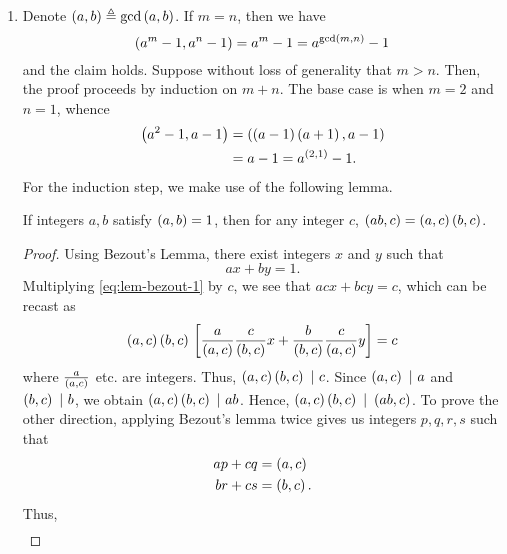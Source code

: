 \documentclass[journal,12pt,onecolumn]{IEEEtran}
\begin{document}
\begin{enumerate}
    \item Denote \(\left(a, b\right) \triangleq \gcd\left(a, b\right)\). If \(m = n\), then
    we have
    \begin{equation}
        \left(a^m-1, a^n-1\right) = a^m - 1
        = a^{\gcd\left(m,n\right)} - 1
        \label{eq:gcd-equal-q3}
    \end{equation}
    and the claim holds. Suppose without loss of generality that \(m > n\).
    Then, the proof proceeds by induction on \(m + n\). The base case is when
    \(m = 2\) and \(n = 1\), whence
    \begin{align}
        \left(a^2 - 1, a - 1\right) &= \left(\left(a-1\right)\left(a+1\right), a-1\right) \\
        &= a-1 = a^{\left(2,1\right)} - 1.
        \label{eq:gcd-base-q3}
    \end{align}
    For the induction step, we make use of the following lemma.
    \begin{lemma}
        \label{lem:coprime-prod}
        If integers \(a, b\) satisfy \(\left(a,b\right) = 1\), then for any integer
        \(c\), \(\left(ab,c\right) = \left(a,c\right)\left(b,c\right)\).
    \end{lemma}
    \begin{proof}
        Using Bezout's Lemma, there exist integers \(x\) and \(y\) such that
        \begin{equation}
            ax + by = 1.
            \label{eq:lem-bezout-1}
        \end{equation}
        Multiplying \eqref{eq:lem-bezout-1} by \(c\), we see that \(acx + bcy =
        c\), which can be recast as
        \begin{equation}
            \left(a,c\right)\left(b,c\right){}\left[\frac{a}{\left(a,c\right)}\frac{c}{\left(b,c\right)}x + \frac{b}{\left(b,c\right)}\frac{c}{\left(a,c\right)}y\right] = c
            \label{eq:recast-lem-bezout-1}
        \end{equation}
        where \(\frac{a}{\left(a,c\right)}\) etc. are integers. Thus,
        \(\left(a,c\right)\left(b,c\right)\ |\ c\). Since \(\left(a,c\right)\ |\ a\) and
        \(\left(b,c\right)\ |\ b\), we obtain \(\left(a,c\right)\left(b,c\right)\ |\ ab\). Hence,
        \(\left(a,c\right)\left(b,c\right)\ |\ \left(ab,c\right)\). To prove the other direction,
        applying Bezout's lemma twice gives us integers \(p, q, r, s\) such that
        \begin{align}
            ap + cq &= \left(a,c\right) \\
            br + cs &= \left(b,c\right).
            \label{eq:lem-bezout-2}
        \end{align}
        Thus,
        \begin{align}

\end{align}
\end{proof}
\end{enumerate}
\end{document}
